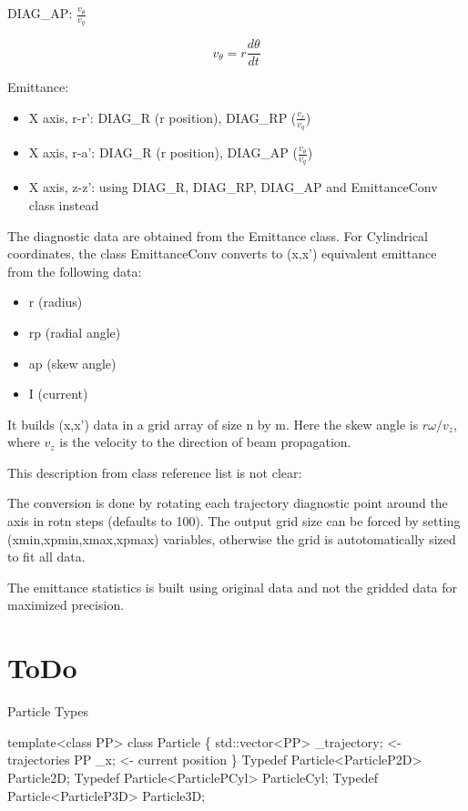 \documentclass[12pt,a4paper]{article}
\begin{document}
DIAG\_AP: $\frac{v_\theta}{v_q}$

$$v_\theta=r\frac{d\theta}{dt}$$

Emittance:
\begin{itemize}
	\item X axis, r-r': DIAG\_R (r position), DIAG\_RP ($\frac{v_r}{v_q}$)
	\item X axis, r-a': DIAG\_R (r position), DIAG\_AP ($\frac{v_\theta}{v_q}$)
	\item X axis, z-z': using DIAG\_R, DIAG\_RP, DIAG\_AP and EmittanceConv class instead
\end{itemize}


The diagnostic data are obtained from the Emittance class. For Cylindrical coordinates, the class EmittanceConv converts to (x,x') equivalent emittance from the following data:

\begin{itemize}
	\item r (radius)
	\item rp (radial angle)
	\item ap (skew angle)
	\item I (current)
\end{itemize}

It builds (x,x') data in a grid array of size n by m. Here the skew angle is $ r\omega/v_z $, where $ v_z $ is the velocity to the direction of beam propagation. 



This description from class reference list is not clear: 

The conversion is done by rotating each trajectory diagnostic point around the axis in rotn steps (defaults to 100). The output grid size can be forced by setting (xmin,xpmin,xmax,xpmax) variables, otherwise the grid is autotomatically sized to fit all data.

The emittance statistics is built using original data and not the gridded data for maximized precision.


\section{ToDo}

Particle Types

template<class PP> class Particle \{
	std::vector<PP> 	\_trajectory; <- trajectories
       PP				\_x; <- current position
\}
Typedef Particle<ParticleP2D> Particle2D;
Typedef Particle<ParticlePCyl> ParticleCyl;
Typedef Particle<ParticleP3D> Particle3D;
\end{document}
